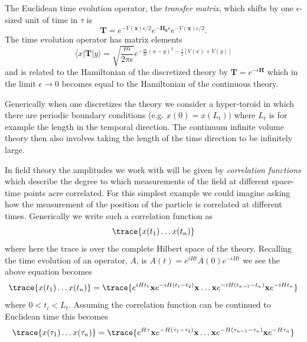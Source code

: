 The Euclidean time evolution operator, the \emph{transfer matrix}, which shifts by one  $\epsilon$-sized unit of time in $\tau$ is 
\begin{equation*}
\mathbf{T}= e^{-V(\mathbf{x})\epsilon/2}e^{-\mathbf{H_0}\epsilon}e^{-V(\mathbf{x}) \epsilon/2} . 
\end{equation*}
The time evolution operator has matrix elements 
\begin{equation*}
\langle x | \mathbf{T} | y \rangle = \sqrt{\frac{m}{2\pi \epsilon}}e^{- \frac{m}{2\epsilon}(x-y)^2 - \frac{\epsilon}{2}\left[ V(x) + V(y) \right]}  
\end{equation*} 
and is related to the Hamiltonian of the discretized theory by $\mathbf{T} = e^{-\epsilon \mathbf{H}}$ which in the limit $\epsilon \to 0$ becomes equal to the Hamiltonian of the continuous theory. 

Generically when one discretizes the theory we consider a hyper-toroid in which there are periodic boundary conditions (e.g. $x(0) = x(L_t))$ where $L_t$ is for example the length in the temporal direction.  The continuum infinite volume theory then also involves taking the length of the time direction to be infinitely large.  

In field theory the amplitudes we work with will be given by \emph{correlation functions} which describe the degree to which measurements of the field at different space-time points acre correlated. For this simplest example we could imagine asking how the measurement of the position of the particle is correlated at different times. Generically we write such a correlation function as 
\begin{equation*}
\trace{ x(t_1) \ldots x(t_n) }
\end{equation*} 
where here the trace is over the complete Hilbert space of the theory. Recalling the time evolution of an operator, $A$, is $A(t) = e^{iHt}A(0)e^{-iHt}$ we see the above equation becomes 
\begin{equation*}
\trace{ x(t_1) \ldots x(t_n) } = \trace{ e^{iHt_1}\mathbf{x}e^{-iH(t_1 -t_2)} \mathbf{x}\ldots \mathbf{x} e^{-iH(t_{n-1} - t_n)} \mathbf{x} e^{-iHt_n }}
\end{equation*} 
where $0 < t_i < L_t$.  Assuming the correlation function can be continued to Euclidean time this becomes  
\begin{equation*}
\trace{ x(\tau_1) \ldots x(\tau_n) } = \trace{ e^{H\tau}\mathbf{x}e^{-H(\tau_1 -\tau_2)} \mathbf{x}\ldots \mathbf{x} e^{-H(\tau_{n-1} - \tau_n)} \mathbf{x} e^{-H\tau_n }}
\end{equation*} 

